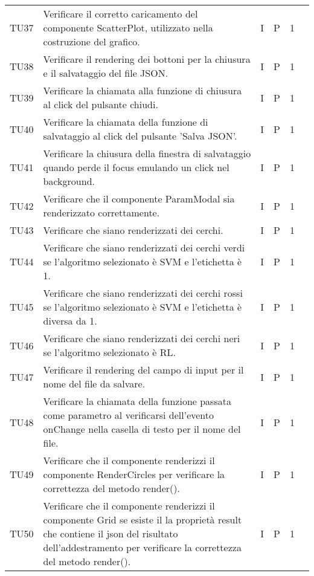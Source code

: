 \begin{longtable} {
		>{}p{12mm}
		>{}p{79.5mm}
		>{}p{9mm}
		>{}p{8mm}
		>{}p{14mm}
		>{}p{0mm}}
	TU37    	& Verificare il corretto caricamento del componente ScatterPlot, utilizzato nella costruzione del grafico. & I & P & 1 &\TBstrut \\ [2mm]
	TU38    	& Verificare il rendering dei bottoni per la chiusura e il salvataggio del file JSON. & I & P & 1 &\TBstrut \\ [2mm]
	TU39    	& Verificare la chiamata alla funzione di chiusura al click del pulsante chiudi. & I & P & 1 &\TBstrut \\ [2mm]
	TU40    	& Verificare la chiamata della funzione di salvataggio al click del pulsante 'Salva JSON'. & I & P & 1 &\TBstrut \\ [2mm]
	TU41    	& Verificare la chiusura della finestra di salvataggio quando perde il focus emulando un click nel background. & I & P & 1 &\TBstrut \\ [2mm]
	TU42		& Verificare che il componente ParamModal sia renderizzato correttamente. & I & P & 1 &\TBstrut \\ [2mm]
	TU43		& Verificare che siano renderizzati dei cerchi.& I & P & 1 &\TBstrut \\ [2mm]
	TU44		& Verificare che siano renderizzati dei cerchi verdi se l'algoritmo selezionato è SVM e l'etichetta è 1.& I & P & 1 &\TBstrut \\ [2mm]
	TU45		& Verificare che siano renderizzati dei cerchi rossi se l'algoritmo selezionato è SVM e l'etichetta è diversa da 1.& I & P & 1 &\TBstrut \\ [2mm]
	TU46		& Verificare che siano renderizzati dei cerchi neri se l'algoritmo selezionato è RL.& I & P & 1 &\TBstrut \\ [2mm]
	TU47    	& Verificare il rendering del campo di input per il nome del file da salvare. & I & P & 1 &\TBstrut \\ [2mm]
	TU48    	& Verificare la chiamata della funzione passata come parametro al verificarsi dell'evento onChange nella casella di testo per il nome del file. & I & P & 1 &\TBstrut \\ [2mm]
	TU49		& Verificare che il componente renderizzi il componente RenderCircles per verificare la correttezza del metodo render().& I & P & 1 &\TBstrut \\ [2mm]
	TU50		& Verificare che il componente renderizzi il componente Grid se esiste il la proprietà result che contiene il json del risultato dell'addestramento per verificare la correttezza del metodo render().& I & P & 1 &\TBstrut \\ [2mm]

\end{longtable}
